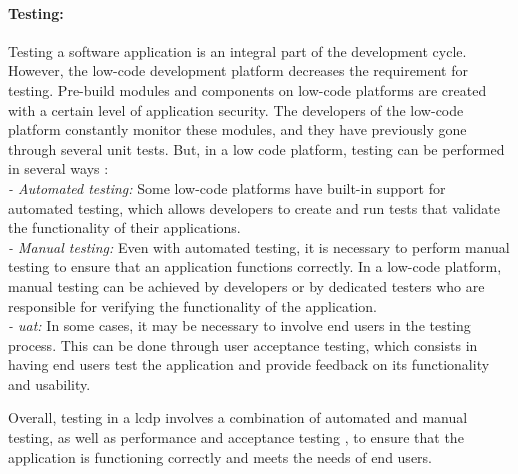 \paragraph*{Testing:}
Testing a software application is an integral part of the development cycle.
However, the low-code development platform decreases the requirement for testing. 
Pre-build modules and components on low-code platforms are created with a certain level of application security. 
The developers of the low-code platform constantly monitor these modules, and they have previously gone through several unit tests.
But, in a low code platform, testing can be performed in several ways \cite{misc:lowcode:testing}: \\
\textit{- Automated testing:} Some low-code platforms have built-in support for automated testing, which allows developers to create and run tests that validate the functionality of their applications.\\
\textit{- Manual testing:} Even with automated testing, it is necessary to perform manual testing to ensure that an application functions correctly. In a low-code platform, manual testing can be achieved by developers or by dedicated testers who are responsible for verifying the functionality of the application.\\
\textit{- \ac{uat}:} In some cases, it may be necessary to involve end users in the testing process. This can be done through user acceptance testing, which consists in having end users test the application and provide feedback on its functionality and usability.

Overall, testing in a \ac{lcdp} involves a combination of automated and manual testing, as well as performance and acceptance testing \cite{misc:lowcode:testing}, to ensure that the application is functioning correctly and meets the needs of end users.
